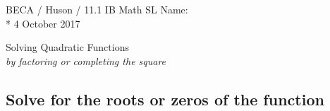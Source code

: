 \documentclass[]{book}
\begin{document}
\noindent BECA / Huson / 11.1 IB Math SL \hspace{2in} Name:\\*
4 October 2017
\begin{center}
{\Large Solving Quadratic Functions}\\
\textit{by factoring or completing the square}
\end{center}



\subsection*{Solve for the roots or zeros of the function}


%

%

%

%

%

%
	
\end{document}
